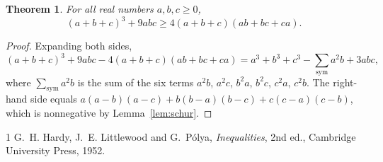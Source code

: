 \documentclass{article}
\newtheorem{theorem}{Theorem}
\begin{document}
\begin{theorem}\label{thm:cubic}
For all real numbers $a, b, c \ge 0$,
\[
  (a + b + c)^3 + 9abc \ge 4(a + b + c)(ab + bc + ca) .
\]
\end{theorem}

\begin{proof}
Expanding both sides,
\[
  (a+b+c)^3 + 9abc - 4(a+b+c)(ab+bc+ca)
  = a^3 + b^3 + c^3 - \sum_{\mathrm{sym}} a^2 b + 3abc ,
\]
where $\sum_{\mathrm{sym}} a^2 b$ is the sum of the six terms $a^2 b$, $a^2 c$, $b^2 a$, $b^2 c$,
$c^2 a$, $c^2 b$. The right-hand side equals
$a(a-b)(a-c) + b(b-a)(b-c) + c(c-a)(c-b)$, which is nonnegative by Lemma~\ref{lem:schur}.
\end{proof}

\begin{thebibliography}{1}
 G.~H. Hardy, J.~E. Littlewood and G.~P\'olya, \emph{Inequalities}, 2nd ed.,
Cambridge University Press, 1952.
\end{thebibliography}
\end{document}
